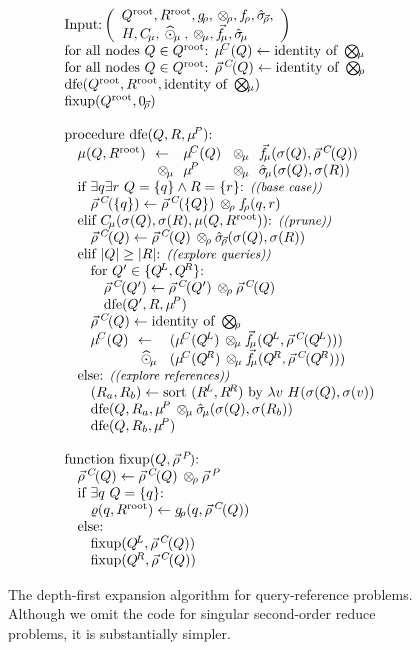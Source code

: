 \documentclass[times, leqno,twocolumn]{article}
\newcommand{\com}[1]{{\small \textit{((#1))}}}
\newcommand{\summary}{\hat{\sigma}}
\newcommand{\psty}{}
\newcommand{\X}{\\ \psty}
\newcommand{\x}{\X \hspace{0.13in}}
\newcommand{\xx}{\X \hspace{0.26in}}
\newcommand{\xxx}{\X \hspace{0.39in}}
\newcommand{\kdroot}[1]{#1^{\text{root}}}
\newcommand{\kdleft}[1]{#1^{\!L}}
\newcommand{\kdright}[1]{#1^{\!R}}
\newcommand{\nameOp}[2]{\mathop{#1\nolimits\!\!_{#2}}}
\newcommand{\nameop}[2]{{\scriptstyle\:}#1_{\!#2}}
\newcommand{\myOp}[1]{\nameOp{\bigotimes}{#1}}
\newcommand{\myop}[1]{\nameop{\otimes}{#1}}
\newcommand{\letterqr}{\rho}
\newcommand{\outqr}{\varrho}
\newcommand{\Opqr}{\myOp{\letterqr}}
\newcommand{\opqr}{\myop{\letterqr}}
\newcommand{\fqr}{f_{\!\letterqr}}
\newcommand{\gqr}{g_{\!\letterqr}}
\newcommand{\letterqrv}{\vec{\rho}}
\newcommand{\deltaqrv}{\summary_{\!\letterqrv}}
\newcommand{\identqr}{0_{\!\letterqrv}}
\newcommand{\varqrv}{\letterqrv^{\:C\!}}
\newcommand{\varqrvparent}{\letterqrv^{\:P\!}}
\newcommand{\lettermu}{\mu}
\newcommand{\inmu}{\mu}
\newcommand{\outopmu}{\:\widehat{\odot}_{\!\mu}\:}
\newcommand{\Opmu}{\myOp{\lettermu}}
\newcommand{\opmu}{\myop{\lettermu}}
\newcommand{\fmuv}{\vec{f_{\!\lettermu}}}
\newcommand{\deltamu}{\summary_{\!\lettermu}}
\newcommand{\canprunemu}{C_{\!\lettermu}}
\newcommand{\heurqr}{H}
\newcommand{\varmuchild}{\lettermu^{\!C}}
\newcommand{\varmuparent}{\lettermu^{\!P}}
\newcommand{\outstat}{\sigma}
\begin{document}
\begin{figure}
\[
  \begin{array}[t]{l}
    \\ \text{Input:}\left(
        \begin{array}[c]{l}\kdroot{Q}, \kdroot{R}, \gqr, \opqr, \fqr, \deltaqrv, \\ \heurqr, \canprunemu, \outopmu, \opmu, \fmuv, \deltamu\end{array}\right)
    \X \text{for all nodes } Q \in \kdroot{Q}\text{: } \varmuchild(Q) \gets \text{identity of }\Opmu
    \X \text{for all nodes } Q \in \kdroot{Q}\text{: } \varqrv(Q) \gets \text{identity of }\Opqr%
    \X \text{dfe}(\kdroot{Q}, \kdroot{R}, \text{identity of }\Opmu)
    \X \text{fixup}(\kdroot{Q}, \identqr)
    \X
    \X \text{procedure dfe}(Q, R, \varmuparent)\text{:}
    \x \!\!\!\begin{array}{lllll}
         \psty\inmu(Q,\kdroot{R}) &\psty\!\!\gets\!\!& \psty\varmuchild(Q) &\psty\!\!\opmu\!\!& \psty\fmuv(\outstat(Q), \varqrv(Q))
         \\              &\psty\!\!\opmu\!\!& \psty\varmuparent   &\psty\!\!\opmu\!\!& \psty\deltamu(\outstat(Q), \outstat(R))
       \end{array}
    \x \text{if } \exists q \exists r ~ Q = \{q\} \wedge R = \{r\}\text{: \com{base case}}
    \xx \varqrv(\{q\}) \gets \varqrv(\{Q\}) \opqr \fqr(q, r)
    \x \text{elif } \canprunemu(\outstat(Q), \outstat(R), \inmu(Q,\kdroot{R}))\text{: \com{prune}}
    \xx \varqrv(Q) \gets \varqrv(Q) \opqr \deltaqrv(\outstat(Q), \outstat(R))
    \x \text{elif } |Q| \geq |R|\text{: \com{explore queries}}
    \xx \text{for } Q' \in \{\kdleft{Q}, \kdright{Q}\}\text{:}
    \xxx \varqrv(Q') \gets \varqrv(Q') \opqr \varqrv(Q)
    \xxx \text{dfe}(Q', R, \varmuparent)
    \xx \varqrv(Q) \gets \text{identity of }\Opqr
    \xx \!\!\!\begin{array}{lll}
         \psty \varmuchild(Q) &\psty\!\!\gets\!\!&\psty (\varmuchild(\kdleft{Q})  \opmu \fmuv(\kdleft{Q}, \varqrv(\kdleft{Q})))
         \\          &\psty\!\!\outopmu\!\!&\psty (\varmuchild(\kdright{Q}) \opmu \fmuv(\kdright{Q}, \varqrv(\kdright{Q})))
        \end{array}
    \x \text{else: \com{explore references}}
    \xx (R_a, R_b) \gets \text{sort }(\kdleft{R}, \kdright{R})\text{ by }\lambda v ~ \heurqr(\sigma(Q), \sigma(v))
    \xx \text{dfe}(Q, R_a, \varmuparent \opmu \deltamu(\outstat(Q), \outstat(R_b))
    \xx \text{dfe}(Q, R_b, \varmuparent)
    \X
    \X \text{function fixup}(Q, \varqrvparent)\text{:}
    \x \varqrv(Q) \gets \varqrv(Q) \opqr \varqrvparent
    \x \text{if } \exists q ~ Q = \{q\}\text{:}
    \xx \outqr(q, \kdroot{R}) \gets \gqr(q, \varqrv(Q))
    \x \text{else:}
    \xx \text{fixup}(\kdleft{Q}, \varqrv(Q))
    \xx \text{fixup}(\kdright{Q}, \varqrv(Q))
  \end{array}
\]
\caption{\label{fig:dfe} The depth-first expansion algorithm for query-reference problems.
Although we omit the code for singular second-order reduce problems, it is substantially simpler.}
\end{figure}
\end{document}

